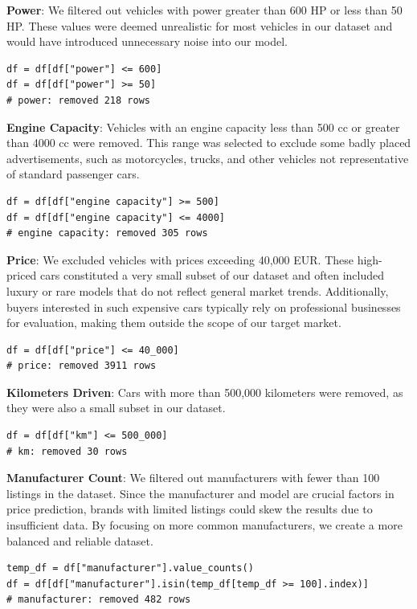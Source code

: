 \textbf{Power}: We filtered out vehicles with power greater than 600 HP or less than 50 HP. These values were deemed unrealistic for most vehicles in our dataset and would have introduced unnecessary noise into our model.

\begin{lstlisting}
df = df[df["power"] <= 600]
df = df[df["power"] >= 50]
# power: removed 218 rows
\end{lstlisting}

\textbf{Engine Capacity}: Vehicles with an engine capacity less than 500 cc or greater than 4000 cc were removed. This range was selected to exclude some badly placed advertisements, such as motorcycles, trucks, and other vehicles not representative of standard passenger cars.

\begin{lstlisting}
df = df[df["engine capacity"] >= 500]
df = df[df["engine capacity"] <= 4000]
# engine capacity: removed 305 rows
\end{lstlisting}

\textbf{Price}: We excluded vehicles with prices exceeding 40,000 EUR. These high-priced cars constituted a very small subset of our dataset and often included luxury or rare models that do not reflect general market trends. Additionally, buyers interested in such expensive cars typically rely on professional businesses for evaluation, making them outside the scope of our target market.

\begin{lstlisting}
df = df[df["price"] <= 40_000]
# price: removed 3911 rows
\end{lstlisting}

\textbf{Kilometers Driven}: Cars with more than 500,000 kilometers were removed, as they were also a small subset in our dataset.

\begin{lstlisting}
df = df[df["km"] <= 500_000]
# km: removed 30 rows
\end{lstlisting}

\textbf{Manufacturer Count}: We filtered out manufacturers with fewer than 100 listings in the dataset. Since the manufacturer and model are crucial factors in price prediction, brands with limited listings could skew the results due to insufficient data. By focusing on more common manufacturers, we create a more balanced and reliable dataset.

\begin{lstlisting}
temp_df = df["manufacturer"].value_counts()
df = df[df["manufacturer"].isin(temp_df[temp_df >= 100].index)]
# manufacturer: removed 482 rows
\end{lstlisting}

